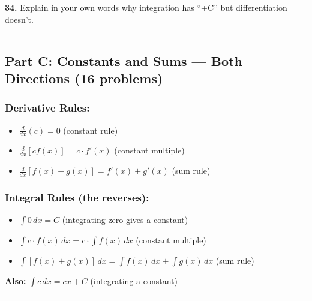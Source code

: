\documentclass[
  11pt,
]{article}
\providecommand{\tightlist}{%
  \setlength{\itemsep}{0pt}\setlength{\parskip}{0pt}}
\begin{document}
\textbf{34.} Explain in your own words why integration has ``+C'' but
differentiation doesn't.

\begin{center}\rule{0.5\linewidth}{0.5pt}\end{center}

\hypertarget{part-c-constants-and-sums-both-directions-16-problems}{%
\subsection{Part C: Constants and Sums --- Both Directions (16
problems)}\label{part-c-constants-and-sums-both-directions-16-problems}}

\hypertarget{derivative-rules}{%
\subsubsection{Derivative Rules:}\label{derivative-rules}}

\begin{itemize}
\tightlist
\item
  \(\frac{d}{dx}(c) = 0\) (constant rule)
\item
  \(\frac{d}{dx}[cf(x)] = c \cdot f'(x)\) (constant multiple)
\item
  \(\frac{d}{dx}[f(x) + g(x)] = f'(x) + g'(x)\) (sum rule)
\end{itemize}

\hypertarget{integral-rules-the-reverses}{%
\subsubsection{Integral Rules (the
reverses):}\label{integral-rules-the-reverses}}

\begin{itemize}
\tightlist
\item
  \(\int 0 \, dx = C\) (integrating zero gives a constant)
\item
  \(\int c \cdot f(x) \, dx = c \cdot \int f(x) \, dx\) (constant
  multiple)
\item
  \(\int [f(x) + g(x)] \, dx = \int f(x) \, dx + \int g(x) \, dx\) (sum
  rule)
\end{itemize}

\textbf{Also:} \(\int c \, dx = cx + C\) (integrating a constant)

\begin{center}\rule{0.5\linewidth}{0.5pt}\end{center}
\end{document}
